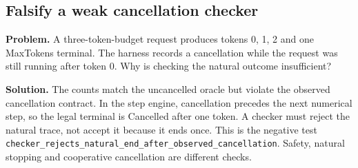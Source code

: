\begin{minipage}{\linewidth}
\subsection{Falsify a weak cancellation checker}
\textbf{Problem.} A three-token-budget request produces tokens 0, 1, 2 and
one MaxTokens terminal. The harness records a cancellation while the
request was still running after token 0. Why is checking the natural
outcome insufficient?

\textbf{Solution.} The counts match the uncancelled oracle but violate the
observed cancellation contract. In the step engine, cancellation precedes
the next numerical step, so the legal terminal is Cancelled after one token.
A checker must reject the natural trace, not accept it because it ends
once. This is the negative test
\texttt{checker\_rejects\_natural\_end\_after\_observed\_cancellation}.
Safety, natural stopping and cooperative cancellation are different checks.
\end{minipage}\par
